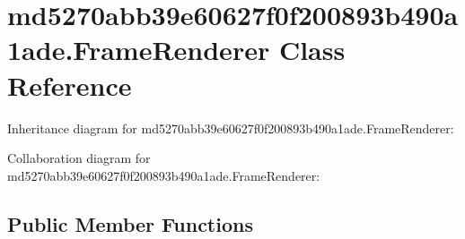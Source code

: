 \hypertarget{classmd5270abb39e60627f0f200893b490a1ade_1_1_frame_renderer}{}\section{md5270abb39e60627f0f200893b490a1ade.\+Frame\+Renderer Class Reference}
\label{classmd5270abb39e60627f0f200893b490a1ade_1_1_frame_renderer}


Inheritance diagram for md5270abb39e60627f0f200893b490a1ade.\+Frame\+Renderer\+:


Collaboration diagram for md5270abb39e60627f0f200893b490a1ade.\+Frame\+Renderer\+:
\subsection*{Public Member Functions}
